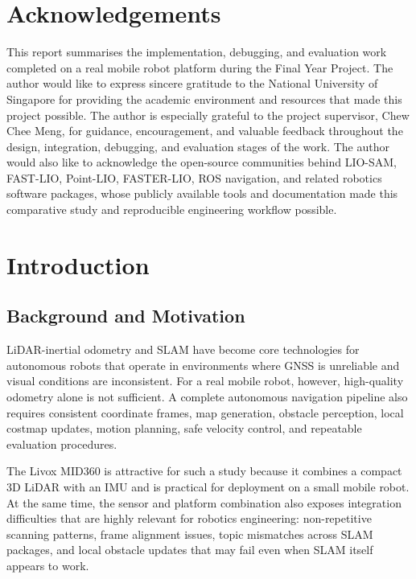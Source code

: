 \documentclass[12pt,a4paper]{report}
\begin{document}
\chapter*{Acknowledgements}
This report summarises the implementation, debugging, and evaluation work completed on a real mobile robot platform during the Final Year Project. The author would like to express sincere gratitude to the National University of Singapore for providing the academic environment and resources that made this project possible. The author is especially grateful to the project supervisor, Chew Chee Meng, for guidance, encouragement, and valuable feedback throughout the design, integration, debugging, and evaluation stages of the work. The author would also like to acknowledge the open-source communities behind LIO-SAM, FAST-LIO, Point-LIO, FASTER-LIO, ROS navigation, and related robotics software packages, whose publicly available tools and documentation made this comparative study and reproducible engineering workflow possible.

\tableofcontents
\listoftables

\clearpage
{}

\chapter{Introduction}

\section{Background and Motivation}
LiDAR-inertial odometry and SLAM have become core technologies for autonomous robots that operate in environments where GNSS is unreliable and visual conditions are inconsistent. For a real mobile robot, however, high-quality odometry alone is not sufficient. A complete autonomous navigation pipeline also requires consistent coordinate frames, map generation, obstacle perception, local costmap updates, motion planning, safe velocity control, and repeatable evaluation procedures.

The Livox MID360 is attractive for such a study because it combines a compact 3D LiDAR with an IMU and is practical for deployment on a small mobile robot. At the same time, the sensor and platform combination also exposes integration difficulties that are highly relevant for robotics engineering: non-repetitive scanning patterns, frame alignment issues, topic mismatches across SLAM packages, and local obstacle updates that may fail even when SLAM itself appears to work.
\end{document}
